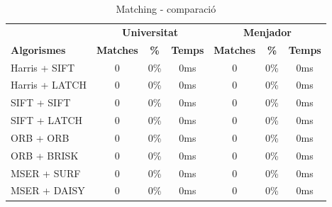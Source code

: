 		\begin{table}[H]
			\begin{center}
				\begin{tabular}{l | c c c | c c c}
					& \multicolumn{3}{c|}{\textbf{Universitat}} & \multicolumn{3}{c}{\textbf{Menjador}} \\
					\textbf{Algorismes} & \textbf{Matches} & \textbf{\%} & \textbf{Temps} & \textbf{Matches} & \textbf{\%} & \textbf{Temps} \\ \hline
					Harris + SIFT & 0 & 0\% & 0ms & 0 & 0\% & 0ms \\
					Harris + LATCH & 0 & 0\% & 0ms & 0 & 0\% & 0ms \\
					SIFT + SIFT & 0 & 0\% & 0ms & 0 & 0\% & 0ms \\
					SIFT + LATCH & 0 & 0\% & 0ms & 0 & 0\% & 0ms \\
					ORB + ORB & 0 & 0\% & 0ms & 0 & 0\% & 0ms \\
					ORB + BRISK & 0 & 0\% & 0ms & 0 & 0\% & 0ms \\
					MSER + SURF & 0 & 0\% & 0ms & 0 & 0\% & 0ms \\
					MSER + DAISY & 0 & 0\% & 0ms & 0 & 0\% & 0ms \\
				\end{tabular}
			\end{center}
			\caption{Matching - comparació}
		\end{table}
